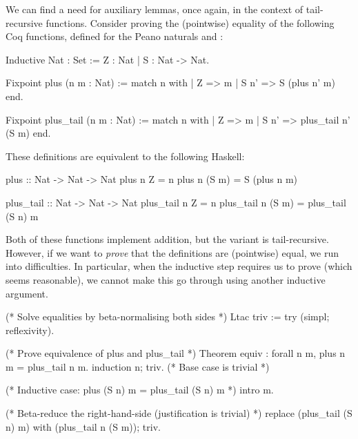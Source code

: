 {%


We can find a need for auxiliary lemmas, once again, in the context of
tail-recursive functions. Consider proving the (pointwise) equality of the
following Coq functions, defined for the Peano naturals  and :

\begin{coqblock}
Inductive Nat : Set := Z : Nat
                     | S : Nat -> Nat.

Fixpoint plus      (n m : Nat) := match n with
                                      | Z    => m
                                      | S n' => S (plus n' m)
                                  end.

Fixpoint plus_tail (n m : Nat) := match n with
                                      | Z    => m
                                      | S n' => plus_tail n' (S m)
                                  end.
\end{coqblock}

These definitions are equivalent to the following Haskell:

\begin{haskell}
plus :: Nat -> Nat -> Nat
plus      n  Z    = n
plus      n (S m) = S (plus n m)

plus_tail :: Nat -> Nat -> Nat
plus_tail n  Z    = n
plus_tail n (S m) = plus_tail (S n) m
\end{haskell}

Both of these functions implement addition, but the  variant is
tail-recursive. However, if we want to \emph{prove} that the definitions are
(pointwise) equal, we run into difficulties. In particular, when the inductive
step requires us to prove  (which seems
reasonable), we cannot make this go through using another inductive argument.

\begin{coqblock}
(* Solve equalities by beta-normalising both sides *)
Ltac triv := try (simpl; reflexivity).

(* Prove equivalence of plus and plus_tail *)
Theorem equiv : forall n m, plus n m = plus_tail n m.
  induction n; triv. (* Base case is trivial *)

  (* Inductive case: plus (S n) m = plus_tail (S n) m *)
  intro m.

  (* Beta-reduce the right-hand-side (justification is trivial) *)
  replace (plus_tail (S n) m) with (plus_tail n (S m)); triv.


\end{coqblock}}
